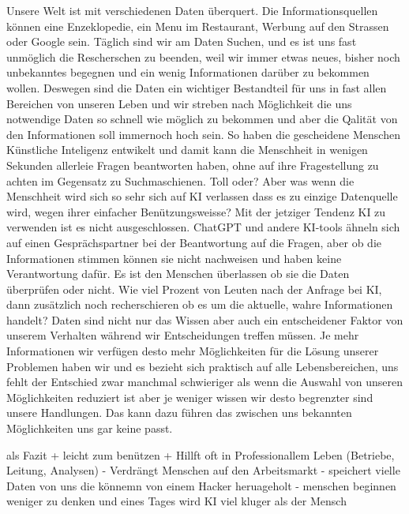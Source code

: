 \documentclass{article}
\begin{document}
Unsere Welt ist mit verschiedenen Daten überquert. Die Informationsquellen können eine Enzeklopedie, ein Menu im Restaurant, Werbung auf den Strassen oder Google sein.
Täglich sind wir am Daten Suchen, und es ist uns fast unmöglich die Rescherschen zu beenden, weil wir immer etwas neues, bisher noch unbekanntes 
begegnen und ein wenig Informationen darüber zu bekommen wollen.
Deswegen sind die Daten ein wichtiger Bestandteil für uns in fast allen Bereichen von unseren Leben 
und wir streben nach Möglichkeit die uns notwendige Daten so schnell wie möglich zu bekommen 
und aber die Qalität von den Informationen soll immernoch hoch sein. So haben die gescheidene Menschen Künstliche Inteligenz
entwikelt und damit kann die Menschheit in wenigen Sekunden allerleie Fragen beantworten haben, ohne auf ihre Fragestellung zu achten im Gegensatz zu Suchmaschienen.
Toll oder? Aber was wenn die Menschheit wird sich so sehr sich auf KI verlassen 
dass es zu einzige Datenquelle wird, wegen ihrer einfacher Benützungsweisse? Mit der jetziger Tendenz KI zu verwenden ist es nicht ausgeschlossen. ChatGPT und andere KI-tools ähneln sich auf einen Gesprächspartner bei der Beantwortung auf die Fragen, aber ob die Informationen stimmen können sie nicht nachweisen und haben keine Verantwortung dafür. 
Es ist den Menschen überlassen 
ob sie die Daten überprüfen oder nicht. Wie viel Prozent von Leuten nach der Anfrage bei KI, dann zusätzlich noch recherschieren ob es um die aktuelle, wahre Informationen handelt? Daten sind nicht nur das Wissen aber auch ein entscheidener Faktor von unserem Verhalten während wir Entscheidungen treffen müssen.
Je mehr Informationen wir verfügen desto mehr Möglichkeiten für die Lösung unserer Problemen haben wir und es bezieht sich praktisch auf alle Lebensbereichen, uns fehlt der Entschied zwar manchmal schwieriger als wenn die Auswahl von unseren Möglichkeiten reduziert ist aber je weniger wissen wir desto begrenzter sind unsere Handlungen.
Das kann dazu führen das zwischen uns bekannten Möglichkeiten uns gar keine passt. 

als Fazit 
+ leicht zum benützen
+ Hillft oft in Professionallem Leben (Betriebe, Leitung, Analysen)
- Verdrängt Menschen auf den Arbeitsmarkt
- speichert vielle Daten von uns die könnemn von einem Hacker heruageholt
- menschen beginnen weniger zu denken und eines Tages wird KI viel kluger als der Mensch 

\printbibliography
\end{document}
